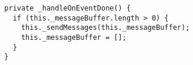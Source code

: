 \begin{verbatim}
  private _handleOnEventDone() {
    if (this._messageBuffer.length > 0) {
      this._sendMessages(this._messageBuffer);
      this._messageBuffer = [];
    }
  }
\end{verbatim}
